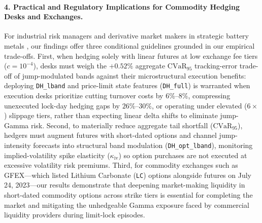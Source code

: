 \documentclass[11pt,a4paper]{article}
\begin{document}
\paragraph{4. Practical and Regulatory Implications for Commodity Hedging Desks and Exchanges.}
For industrial risk managers and derivative market makers in strategic battery metals \citep{Kong2024,Geng2025}, our findings offer three conditional guidelines grounded in our empirical trade-offs. First, when hedging solely with linear futures at low exchange fee tiers ($c = 10^{-4}$), desks must weigh the $+0.52\%$ aggregate $\text{CVaR}_{95}$ tracking-error trade-off of jump-modulated bands against their microstructural execution benefits: deploying \texttt{DH\_lband} and price-limit state features (\texttt{DH\_full}) is warranted when execution desks prioritize cutting turnover costs by $6\%\text{--}8\%$, compressing unexecuted lock-day hedging gaps by $26\%\text{--}30\%$, or operating under elevated ($6\times$) slippage tiers, rather than expecting linear delta shifts to eliminate jump-Gamma risk. Second, to materially reduce aggregate tail shortfall ($\text{CVaR}_{95}$), hedgers must augment futures with short-dated options and channel jump-intensity forecasts into structural band modulation (\texttt{DH\_opt\_lband}), monitoring implied-volatility spike elasticity ($\kappa_{\text{iv}}$) so option purchases are not executed at excessive volatility risk premiums. Third, for commodity exchanges such as GFEX---which listed Lithium Carbonate (\texttt{LC}) options alongside futures on July 24, 2023---our results demonstrate that deepening market-making liquidity in short-dated commodity options across strike tiers is essential for completing the market and mitigating the unhedgeable Gamma exposure faced by commercial liquidity providers during limit-lock episodes.
\end{document}
